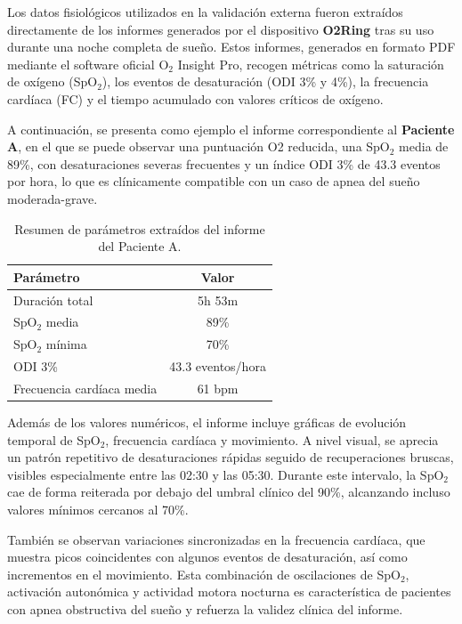 Los datos fisiológicos utilizados en la validación externa fueron extraídos directamente de los informes generados por el dispositivo \textbf{O2Ring} tras su uso durante una noche completa de sueño. Estos informes, generados en formato PDF mediante el software oficial O$_2$ Insight Pro, recogen métricas como la saturación de oxígeno (SpO$_2$), los eventos de desaturación (ODI 3\% y 4\%), la frecuencia cardíaca (FC) y el tiempo acumulado con valores críticos de oxígeno.

A continuación, se presenta como ejemplo el informe correspondiente al \textbf{Paciente A}, en el que se puede observar una puntuación O2 reducida, una SpO$_2$ media de 89\%, con desaturaciones severas frecuentes y un índice ODI 3\% de 43.3 eventos por hora, lo que es clínicamente compatible con un caso de apnea del sueño moderada-grave.

\begin{table}[H]
    \centering
    \begin{tabular}{|l|c|}
    \hline
    \textbf{Parámetro} & \textbf{Valor} \\
    \hline
    Duración total & 5h 53m \\
    SpO$_2$ media & 89\% \\
    SpO$_2$ mínima & 70\% \\
    ODI 3\% & 43.3 eventos/hora \\
    Frecuencia cardíaca media & 61 bpm \\
    \hline
    \end{tabular}
    \caption{Resumen de parámetros extraídos del informe del Paciente A.}
\end{table}

Además de los valores numéricos, el informe incluye gráficas de evolución temporal de SpO$_2$, frecuencia cardíaca y movimiento. A nivel visual, se aprecia un patrón repetitivo de desaturaciones rápidas seguido de recuperaciones bruscas, visibles especialmente entre las 02:30 y las 05:30. Durante este intervalo, la SpO$_2$ cae de forma reiterada por debajo del umbral clínico del 90\%, alcanzando incluso valores mínimos cercanos al 70\%.

También se observan variaciones sincronizadas en la frecuencia cardíaca, que muestra picos coincidentes con algunos eventos de desaturación, así como incrementos en el movimiento. Esta combinación de oscilaciones de SpO$_2$, activación autonómica y actividad motora nocturna es característica de pacientes con apnea obstructiva del sueño y refuerza la validez clínica del informe.


